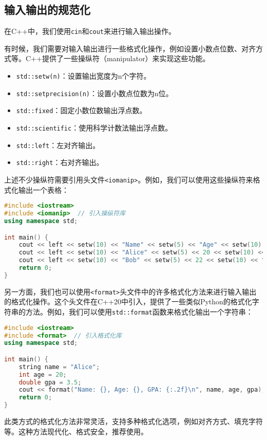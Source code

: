 \documentclass[../main.tex]{subfiles}
\begin{document}
\subsection{输入输出的规范化}

在C++中，我们使用\texttt{cin}和\texttt{cout}来进行输入输出操作。

有时候，我们需要对输入输出进行一些格式化操作，例如设置小数点位数、对齐方式等。C++提供了一些操纵符（manipulator）来实现这些功能。
\begin{itemize}
  \item \texttt{std::setw(n)}：设置输出宽度为n个字符。
  \item \texttt{std::setprecision(n)}：设置小数点位数为n位。
  \item \texttt{std::fixed}：固定小数位数输出浮点数。
  \item \texttt{std::scientific}：使用科学计数法输出浮点数。
  \item \texttt{std::left}：左对齐输出。
  \item \texttt{std::right}：右对齐输出。
\end{itemize}

上述不少操纵符需要引用头文件\texttt{<iomanip>}。例如，我们可以使用这些操纵符来格式化输出一个表格：
\begin{lstlisting}[language=C++]
#include <iostream>
#include <iomanip>  // 引入操纵符库
using namespace std;

int main() {
    cout << left << setw(10) << "Name" << setw(5) << "Age" << setw(10) << "GPA" << endl;
    cout << left << setw(10) << "Alice" << setw(5) << 20 << setw(10) << fixed << setprecision(2) << 3.5 << endl;
    cout << left << setw(10) << "Bob" << setw(5) << 22 << setw(10) << fixed << setprecision(2) << 3.8 << endl;
    return 0;
}
\end{lstlisting}

另一方面，我们也可以使用\texttt{<format>}头文件中的许多格式化方法来进行输入输出的格式化操作。这个头文件在C++20中引入，提供了一些类似Python的格式化字符串的方法。例如，我们可以使用\texttt{std::format}函数来格式化输出一个字符串：
\begin{lstlisting}[language=C++]
#include <iostream>
#include <format>  // 引入格式化库
using namespace std;

int main() {
    string name = "Alice";
    int age = 20;
    double gpa = 3.5;
    cout << format("Name: {}, Age: {}, GPA: {:.2f}\n", name, age, gpa);
    return 0;
}
\end{lstlisting}
此类方式的格式化方法非常灵活，支持多种格式化选项，例如对齐方式、填充字符等。这种方法现代化、格式安全，推荐使用。
\end{document}
